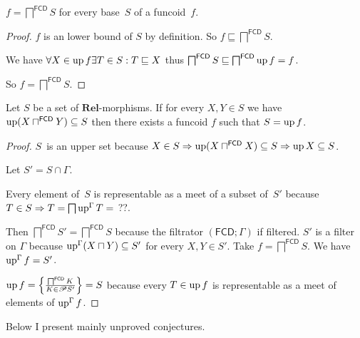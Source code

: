\begin{prop}
$f = \bigsqcap^{\mathsf{FCD}} S$ for every base~$S$ of a funcoid~$f$.
\end{prop}

\begin{proof}
$f$ is an lower bound of $S$ by definition. So $f \sqsubseteq
\bigsqcap^{\mathsf{FCD}} S$.

We have $\forall X \in \operatorname{up} f \exists T \in S : T \sqsubseteq X$ thus
$\bigsqcap^{\mathsf{FCD}} S \sqsubseteq \bigsqcap^{\mathsf{FCD}}
\operatorname{up} f = f$.

So $f = \bigsqcap^{\mathsf{FCD}} S$.
\end{proof}


\begin{thm}
  Let $S$ be a set of $\mathbf{Rel}$-morphisms. If for every $X, Y
  \in S$ we have $\operatorname{up} (X \sqcap^{\mathsf{FCD}} Y) \subseteq S$
  then there exists a funcoid $f$ such that $S = \operatorname{up} f$.
\end{thm}

\begin{proof}

  $S$~is an upper set because
  $X\in S\Rightarrow \operatorname{up} (X \sqcap^{\mathsf{FCD}} X) \subseteq S\Rightarrow \operatorname{up} X\subseteq S$.

  Let $S' = S \cap \Gamma$.
  
  Every element of~$S$ is representable as a meet of a subset of~$S'$ because
  $T\in S\Rightarrow T=\bigsqcap \operatorname{up}^{\Gamma} T=$
  ??.
  
  Then $\bigsqcap^{\mathsf{FCD}} S' =
  \bigsqcap^{\mathsf{FCD}} S$ because the filtrator
  $(\mathsf{FCD} ; \Gamma)$ if filtered. $S'$ is a filter on $\Gamma$
  because $\operatorname{up}^{\Gamma} (X \sqcap Y) \subseteq S'$ for every $X, Y \in
  S'$. Take $f = \bigsqcap^{\mathsf{FCD}} S$. We have
  $\operatorname{up}^{\Gamma} f = S'$.
  
  $\operatorname{up} f = \left\{ \frac{ \bigsqcap^{\mathsf{FCD}} K }{
  K \in \mathscr{P} S' }\right\} = S$ because every $T \in
  \operatorname{up} f$ is representable as a meet of elements of $\operatorname{up}^{\Gamma} f$.
\end{proof}

\noindent\makebox[\linewidth]{\rule{\paperwidth}{0.4pt}}

Below I present mainly unproved conjectures.

